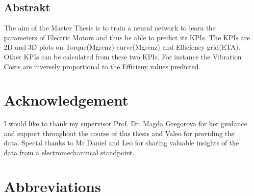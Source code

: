 \documentclass{report} %
\begin{document}
\section*{Abstrakt}
The aim of the Master Thesis is to train a neural network to learn the parameters of Electric Motors and thus be able to predict its KPIs.
The KPIs are 2D and 3D plots on Torque(Mgrenz) curve(Mgrenz) and Efficiency grid(ETA). Other KPIs can be calculated from these two KPIs.
For instance the Vibration Costs are inversely proportional to the Efficieny values predicted. 


\newpage 

\newpage 

\chapter*{Acknowledgement}
I would like to thank my supervisor Prof. Dr. Magda Gregorova for her guidance and support throughout the course of this thesis and Valeo for providing the data.
Special thanks to Mr Daniel and Leo for sharing valuable insights of the data from a electromechanincal standpoint.

\newpage

\newpage

\begin{spacing}{1.2}
    \tableofcontents
\end{spacing}

\newpage

\newpage

\chapter*{Abbreviations}
\begin{acronym}[TDMA]
  

\end{acronym}

\newpage

\newpage
\end{document}

